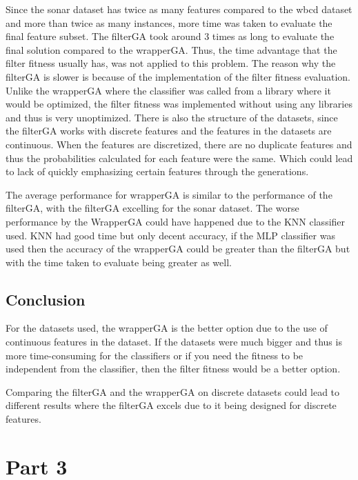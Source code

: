 \documentclass{article}
\begin{document}
Since the sonar dataset has twice as many features compared to the wbcd dataset and more than twice as many instances, more time was taken to evaluate the final feature subset. The filterGA took around 3 times as long to evaluate the final solution compared to the wrapperGA. Thus, the time advantage that the filter fitness usually has, was not applied to this problem. The reason why the filterGA is slower is because of the implementation of the filter fitness evaluation. Unlike the wrapperGA where the classifier was called from a library where it would be optimized, the filter fitness was implemented without using any libraries and thus is very unoptimized. There is also the structure of the datasets, since the filterGA works with discrete features and the features in the datasets are continuous. When the features are discretized, there are no duplicate features and thus the probabilities calculated for each feature were the same. Which could lead to lack of quickly emphasizing certain features through the generations. \par
\noindent The average performance for wrapperGA is similar to the performance of the filterGA, with the filterGA excelling for the sonar dataset. The worse performance by the WrapperGA could have happened due to the KNN classifier used. KNN had good time but only decent accuracy, if the MLP classifier was used then the accuracy of the wrapperGA could be greater than the filterGA but with the time taken to evaluate being greater as well. \par
\subsection*{Conclusion}
For the datasets used, the wrapperGA is the better option due to the use of continuous features in the dataset. If the datasets were much bigger and thus is more time-consuming for the classifiers or if you need the fitness to be independent from the classifier, then the filter fitness would be a better option. \par
\noindent Comparing the filterGA and the wrapperGA on discrete datasets could lead to different results where the filterGA excels due to it being designed for discrete features. \par
\section*{Part 3}
\end{document}
